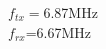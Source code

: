 \documentclass[preview]{standalone}
\begin{document}
\begin{center}
$f_{tx}=$6.87MHz\\$f_{rx}$=6.67MHz
\end{center}
\end{document}
